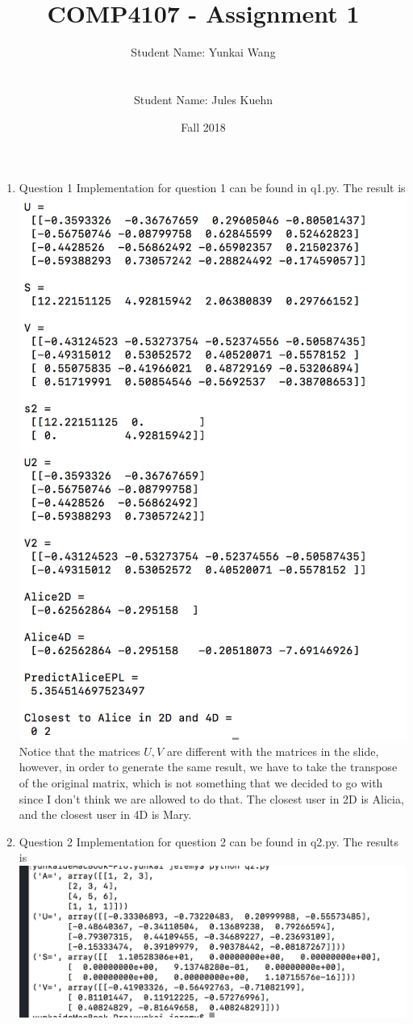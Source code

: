 \documentclass[11pt]{article}
\title{COMP4107 - Assignment 1}
\author{Student Name: Yunkai Wang\\
\text{Student Number: 100968473}\\\\
Student Name: Jules Kuehn\\
\text{Student Number: 100661464}}
\date{Fall 2018}
\begin{document}
\maketitle
\begin{enumerate}

\item Question 1
Implementation for question 1 can be found in q1.py. The result is\\
\includegraphics[width=0.5\columnwidth]{q1_result}\\
Notice that the matrices $U, V$ are different with the matrices in the slide, however, in order to generate the same result, we have to take the transpose of the original matrix, which is not something that we decided to go with since I don't think we are allowed to do that. The closest user in 2D is Alicia, and the closest user in 4D is Mary.

\item Question 2\newline
Implementation for question 2 can be found in q2.py. The results is\\
\includegraphics{q2_result}


\end{enumerate}
\end{document}
